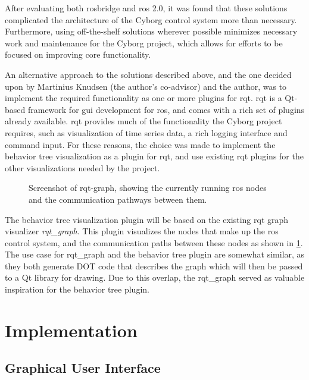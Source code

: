 \documentclass[\rootfolder/main.tex]{subfiles}
\begin{document}
After evaluating both rosbridge and \acrshort{ros} 2.0, it was found that these solutions complicated the architecture of the Cyborg control system more than necessary.
Furthermore, using off-the-shelf solutions wherever possible minimizes necessary work and maintenance for the Cyborg project, which allows for efforts to be focused on improving core functionality.

An alternative approach to the solutions described above, and the one decided upon by Martinius Knudsen (the author's co-advisor) and the author, was to implement the required functionality as one or more plugins for rqt.
rqt is a Qt-based framework for \acrfull{gui} development for \acrshort{ros}, and comes with a rich set of plugins already available.
rqt provides much of the functionality the Cyborg project requires, such as visualization of time series data, a rich logging interface and command input.
For these reasons, the choice was made to implement the behavior tree visualization as a plugin for rqt, and use existing rqt plugins for the other visualizations needed by the project.

\begin{figure}[ht]
    \caption{Screenshot of rqt-graph, showing the currently running \acrshort{ros} nodes and the communication pathways between them.}
    \label{fig:rqt-graph}
\end{figure}

The behavior tree visualization plugin will be based on the existing rqt graph visualizer \emph{rqt\_graph}.
This plugin visualizes the nodes that make up the \acrshort{ros} control system, and the communication paths between these nodes as shown in \cref{fig:rqt-graph}.
The use case for rqt\_graph and the behavior tree plugin are somewhat similar, as they both generate DOT code that describes the graph which will then be passed to a Qt library for drawing.
Due to this overlap, the rqt\_graph served as valuable inspiration for the behavior tree plugin.


\section{Implementation}

\subsection{Graphical User Interface}
\end{document}
